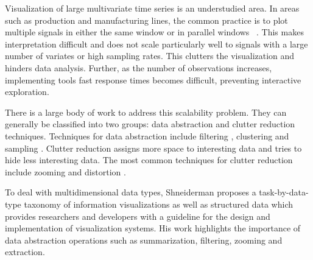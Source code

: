
Visualization of large multivariate time series is an understudied area. In areas such as production and manufacturing lines, the common practice is to plot multiple signals in either the same window or in parallel windows~\cite{} . This makes interpretation difficult and does not scale particularly well to signals with a large number of variates or high sampling rates. %
This clutters the visualization and hinders data analysis. Further, as the number of observations increases, implementing tools fast response times becomes difficult, preventing interactive exploration.

There is a large body of work to address this scalability problem.
They can generally be classified into two groups: data abstraction and clutter reduction 
techniques. Techniques for data abstraction include filtering \cite{conf/chi/AhlbergS94b}, clustering
and sampling \cite{553159}. Clutter reduction assigns more space to interesting data and tries to hide less interesting data.
The most common techniques for clutter reduction include zooming and distortion \cite{559215,1382895,1196005}.
%
%

To deal with multidimensional data types, Shneiderman \cite{545307} proposes a task-by-data-type taxonomy of information visualizations as well as structured data which provides researchers and developers with a guideline for
the design and implementation of visualization systems. His work highlights the importance of data
abstraction operations such as summarization, filtering, zooming and extraction.
%

